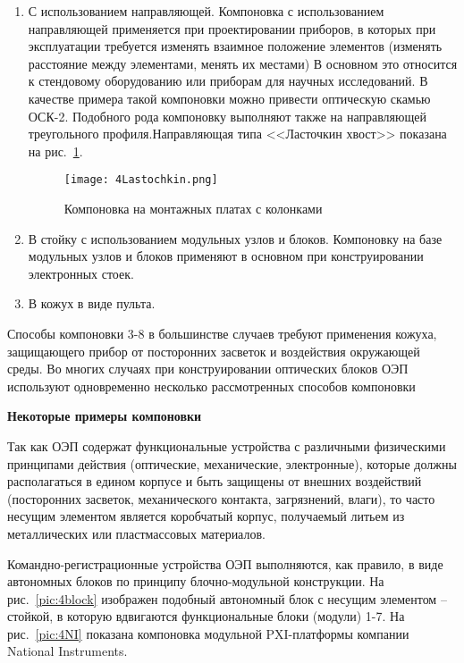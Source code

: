 \begin{enumerate}
	\item С использованием направляющей. Компоновка с использованием направляющей применяется при проектировании приборов, в которых при эксплуатации требуется изменять взаимное положение элементов (изменять расстояние между элементами, менять их местами) В основном это относится к стендовому оборудованию или приборам для научных исследований. В качестве примера такой компоновки можно привести оптическую скамью ОСК-2. Подобного рода компоновку выполняют также на направляющей треугольного профиля.Направляющая типа <<Ласточкин хвост>> показана на рис.~\ref{pic:4Lastochkin}.
	
	\begin{figure}[h!]
		\caption{Компоновка на монтажных платах с колонками}
		\texttt{[image: 4Lastochkin.png]}
		\label{pic:4Lastochkin}
	\end{figure}
	
	\item В стойку с использованием модульных узлов и блоков. Компоновку на базе модульных узлов и блоков применяют в основном при конструировании электронных стоек.
	
	\item В кожух в виде пульта.
\end{enumerate}

Способы компоновки 3-8 в большинстве случаев требуют применения кожуха, защищающего прибор от посторонних засветок и воздействия окружающей среды. Во многих случаях при конструировании оптических блоков ОЭП используют одновременно несколько рассмотренных способов компоновки

\begin{flushleft}
	\textbf{Некоторые примеры компоновки}
\end{flushleft}

Так как ОЭП содержат функциональные устройства с различными физическими принципами действия (оптические, механические, электронные), которые должны располагаться в едином корпусе и быть защищены от внешних воздействий (посторонних засветок, механического контакта, загрязнений, влаги), то часто несущим элементом является коробчатый корпус, получаемый литьем из металлических или пластмассовых материалов.

Командно-регистрационные устройства ОЭП выполняются, как правило, в виде автономных блоков по принципу блочно-модульной конструкции. На рис.~\ref{pic:4block} изображен подобный автономный блок с несущим элементом -- стойкой, в которую вдвигаются функциональные блоки (модули) 1-7. На рис.~\ref{pic:4NI} показана компоновка модульной PXI-платформы компании National Instruments.

